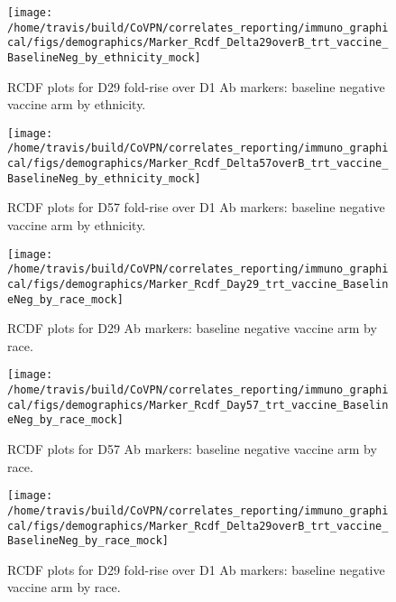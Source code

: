 \documentclass[]{book}
\theoremstyle{definition}
\theoremstyle{definition}
\theoremstyle{definition}
\newcommand{\1}{\mathbbm{1}}
\begin{document}
\clearpage
\begin{figure}[H]

{\centering \texttt{[image: /home/travis/build/CoVPN/correlates\_reporting/immuno\_graphical/figs/demographics/Marker\_Rcdf\_Delta29overB\_trt\_vaccine\_BaselineNeg\_by\_ethnicity\_mock]} 

}

\caption{RCDF plots for D29 fold-rise over D1 Ab markers: baseline negative vaccine arm by ethnicity.}\label{fig:unnamed-chunk-78}
\end{figure}

\clearpage
\begin{figure}[H]

{\centering \texttt{[image: /home/travis/build/CoVPN/correlates\_reporting/immuno\_graphical/figs/demographics/Marker\_Rcdf\_Delta57overB\_trt\_vaccine\_BaselineNeg\_by\_ethnicity\_mock]} 

}

\caption{RCDF plots for D57 fold-rise over D1 Ab markers: baseline negative vaccine arm by ethnicity.}\label{fig:unnamed-chunk-79}
\end{figure}

\clearpage
\begin{figure}[H]

{\centering \texttt{[image: /home/travis/build/CoVPN/correlates\_reporting/immuno\_graphical/figs/demographics/Marker\_Rcdf\_Day29\_trt\_vaccine\_BaselineNeg\_by\_race\_mock]} 

}

\caption{RCDF plots for D29 Ab markers: baseline negative vaccine arm by race.}\label{fig:unnamed-chunk-80}
\end{figure}

\clearpage
\begin{figure}[H]

{\centering \texttt{[image: /home/travis/build/CoVPN/correlates\_reporting/immuno\_graphical/figs/demographics/Marker\_Rcdf\_Day57\_trt\_vaccine\_BaselineNeg\_by\_race\_mock]} 

}

\caption{RCDF plots for D57 Ab markers: baseline negative vaccine arm by race.}\label{fig:unnamed-chunk-81}
\end{figure}

\clearpage
\begin{figure}[H]

{\centering \texttt{[image: /home/travis/build/CoVPN/correlates\_reporting/immuno\_graphical/figs/demographics/Marker\_Rcdf\_Delta29overB\_trt\_vaccine\_BaselineNeg\_by\_race\_mock]} 

}

\caption{RCDF plots for D29 fold-rise over D1 Ab markers: baseline negative vaccine arm by race.}\label{fig:unnamed-chunk-82}
\end{figure}
\end{document}
